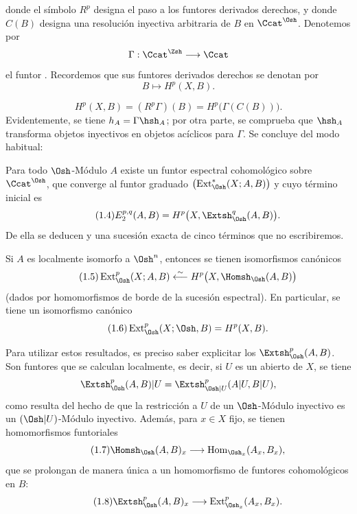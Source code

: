 donde el símbolo $R^{p}$ designa el paso a los funtores derivados derechos, y donde
$C(B)$ designa una resolución inyectiva arbitraria de $B$ en $\Ccat^{\Osh}$.
Denotemos por
\[
  \Gamma:\Ccat^{\Zsh}\longrightarrow\Ccat
\]
el funtor . Recordemos que sus funtores derivados derechos se
denotan por
\[
  B\longmapsto H^{p}(X,B).
\]

\begin{equation}\tag{1.3}
  H^{p}(X,B)=(R^{p}\Gamma)(B)=H^{p}\bigl(\Gamma(C(B))\bigr).
\end{equation}
Evidentemente, se tiene $h_A=\Gamma\hsh_A$; por otra parte, se comprueba que $\hsh_A$
transforma objetos inyectivos en objetos acíclicos para $\Gamma$. Se concluye del
modo habitual:

 Para todo $\Osh$-Módulo $A$ existe un funtor
espectral cohomológico sobre $\Ccat^{\Osh}$, que converge al funtor graduado
$\bigl(\operatorname{Ext}_{\Osh}^{*}(X;A,B)\bigr)$ y cuyo término inicial es
\begin{equation}\tag{1.4}
  E_{2}^{p,q}(A,B)=H^{p}\bigl(X,\Extsh_{\Osh}^{q}(A,B)\bigr).
\end{equation}
De ella se deducen  y una sucesión exacta de cinco términos
que no escribiremos.

 Si $A$ es localmente isomorfo a $\Osh^{n}$, entonces se tienen
isomorfismos canónicos
\begin{equation}\tag{1.5}
  \operatorname{Ext}_{\Osh}^{p}(X;A,B)
  \overset{\sim}{\longleftarrow}
  H^{p}\bigl(X,\Homsh_{\Osh}(A,B)\bigr)
\end{equation}
(dados por homomorfismos de borde de la sucesión espectral). En particular, se tiene
un isomorfismo canónico
\begin{equation}\tag{1.6}
  \operatorname{Ext}_{\Osh}^{p}(X;\Osh,B)=H^{p}(X,B).
\end{equation}

Para utilizar estos resultados, es preciso saber explicitar los
$\Extsh_{\Osh}^{p}(A,B)$. Son funtores que se calculan localmente,
es decir, si $U$ es un abierto de $X$, se tiene
\[
  \Extsh_{\Osh}^{p}(A,B)|U
  =\Extsh_{\Osh|U}^{p}(A|U,B|U),
\]
como resulta del hecho de que la restricción a $U$ de un $\Osh$-Módulo inyectivo
es un $(\Osh|U)$-Módulo inyectivo. Además, para $x\in X$ fijo, se tienen homomorfismos funtoriales
\begin{equation}\tag{1.7}
  \Homsh_{\Osh}(A,B)_x
  \longrightarrow
  \operatorname{Hom}_{\Osh_x}(A_x,B_x),
\end{equation}
que se prolongan de manera única a un homomorfismo de funtores cohomológicos
en $B$:
\begin{equation}\tag{1.8}
  \Extsh_{\Osh}^{p}(A,B)_x
  \longrightarrow
  \operatorname{Ext}_{\Osh_x}^{p}(A_x,B_x).
\end{equation}

